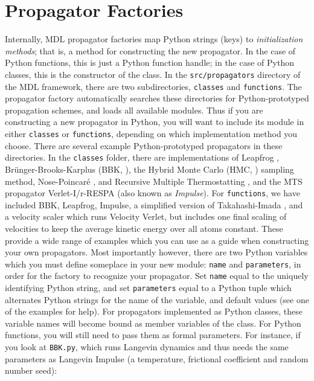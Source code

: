 \documentclass[11pt]{report}
\begin{document}
\section{Propagator Factories}

Internally, MDL propagator factories map Python strings (keys) to 
{\it initialization methods}; that is, a method for constructing the new propagator.
In the case of Python functions, this is just a Python function handle; in the
case of Python classes, this is the constructor of the class.
In the \texttt{src/propagators} directory of the MDL framework, there are two
subdirectories, \texttt{classes} and \texttt{functions}.  The propagator
factory automatically searches these directories for Python-prototyped
propagation schemes, and loads all available modules.  Thus if you are constructing
a new propagator in Python, you will want to include its module in either
\texttt{classes} or \texttt{functions}, depending on which implementation
method you choose.  There are several example Python-prototyped propagators
in these directories.  In the \texttt{classes} folder, there are implementations
of Leapfrog \cite{HoEa81}, Br{\"u}nger-Brooks-Karplus (BBK, \cite{BrBk82}), the Hybrid Monte Carlo (HMC, \cite{})
sampling method, Nose-Poincar\'e \cite{}, and Recursive Multiple Thermostatting \cite{Swee04}, and
the MTS propagator Verlet-I/r-RESPA \cite{GRUB89A, GHWS91, TuBM92} (also known as {\it Impulse}).
For \texttt{functions}, we have included BBK, Leapfrog, Impulse, a simplified
version of Takahashi-Imada \cite{TaIm84}, and a velocity scaler which runs Velocity Verlet,
but includes one final scaling of velocities to keep the average kinetic energy
over all atoms constant.  These provide a wide range of examples which you can
use as a guide when constructing your own propagators.  Most importantly however, there
are two Python variables which you must define someplace in your new module: \texttt{name}
and \texttt{parameters}, in order for the factory to recognize your propagator.
Set \texttt{name} equal to the uniquely identifying Python string, and set \texttt{parameters}
equal to a Python tuple which alternates Python strings for the name of the variable,
and default values (see one of the examples for help).  For propagators implemented as Python classes, 
these variable names will become bound as member variables of the class.  For Python
functions, you will still need to pass them as formal parameters.  For instance, if you look
at \texttt{BBK.py}, which runs Langevin dynamics and thus needs the same parameters
as Langevin Impulse (a temperature, frictional coefficient and random number seed):
\end{document}
